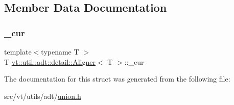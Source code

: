 \subsection{Member Data Documentation}
\mbox{\label{structvt_1_1util_1_1adt_1_1detail_1_1_aligner_3_01_t_01_4_a7dd4c938c142ee94477bf484cdbde0c9}} 
\subsubsection{\texorpdfstring{\+\_\+cur}{\_cur}}
{\footnotesize\ttfamily template$<$typename T $>$ \\
T \hyperlink{structvt_1_1util_1_1adt_1_1detail_1_1_aligner}{vt\+::util\+::adt\+::detail\+::\+Aligner}$<$ T $>$\+::\+\_\+cur}



The documentation for this struct was generated from the following file\+:\begin{DoxyCompactItemize}
\item 
src/vt/utils/adt/\hyperlink{union_8h}{union.\+h}\end{DoxyCompactItemize}
